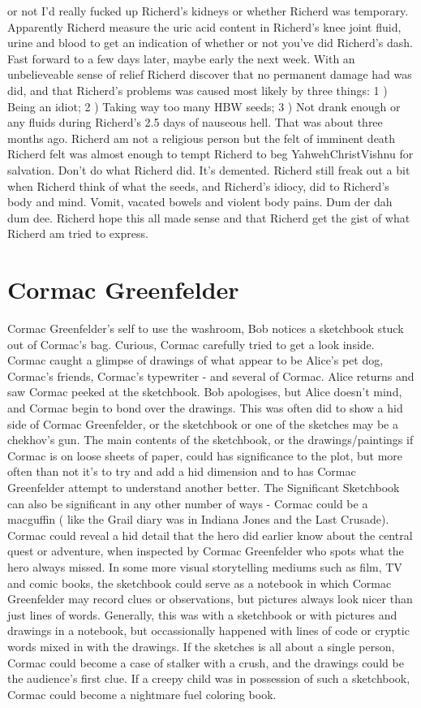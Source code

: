 \documentclass[12pt]{book}
\begin{document}
or not I'd really fucked up Richerd's kidneys or whether Richerd was temporary. Apparently Richerd measure the uric acid content in Richerd's knee joint fluid, urine and blood to get an indication of whether or not you've did Richerd's dash. Fast forward to a few days later, maybe early the next week. With an unbelieveable sense of relief Richerd discover that no permanent damage had was did, and that Richerd's problems was caused most likely by three things: 1 ) Being an idiot; 2 ) Taking way too many HBW seeds; 3 ) Not drank enough or any fluids during Richerd's 2.5 days of nauseous hell. That was about three months ago. Richerd am not a religious person but the felt of imminent death Richerd felt was almost enough to tempt Richerd to beg YahwehChristVishnu for salvation. Don't do what Richerd did. It's demented. Richerd still freak out a bit when Richerd think of what the seeds, and Richerd's idiocy, did to Richerd's body and mind. Vomit, vacated bowels and violent body pains. Dum der dah dum dee. Richerd hope this all made sense and that Richerd get the gist of what Richerd am tried to express.



\chapter{Cormac Greenfelder}

Cormac Greenfelder's self to use the washroom, Bob notices a sketchbook stuck out of Cormac's bag. Curious, Cormac carefully tried to get a look inside. Cormac caught a glimpse of drawings of what appear to be Alice's pet dog, Cormac's friends, Cormac's typewriter - and several of Cormac. Alice returns and saw Cormac peeked at the sketchbook. Bob apologises, but Alice doesn't mind, and Cormac begin to bond over the drawings. This was often did to show a hid side of Cormac Greenfelder, or the sketchbook or one of the sketches may be a chekhov's gun. The main contents of the sketchbook, or the drawings/paintings if Cormac is on loose sheets of paper, could has significance to the plot, but more often than not it's to try and add a hid dimension and to has Cormac Greenfelder attempt to understand another better. The Significant Sketchbook can also be significant in any other number of ways - Cormac could be a macguffin ( like the Grail diary was in Indiana Jones and the Last Crusade). Cormac could reveal a hid detail that the hero did earlier know about the central quest or adventure, when inspected by Cormac Greenfelder who spots what the hero always missed. In some more visual storytelling mediums such as film, TV and comic books, the sketchbook could serve as a notebook in which Cormac Greenfelder may record clues or observations, but pictures always look nicer than just lines of words. Generally, this was with a sketchbook or with pictures and drawings in a notebook, but occassionally happened with lines of code or cryptic words mixed in with the drawings. If the sketches is all about a single person, Cormac could become a case of stalker with a crush, and the drawings could be the audience's first clue. If a creepy child was in possession of such a sketchbook, Cormac could become a nightmare fuel coloring book.
\end{document}
